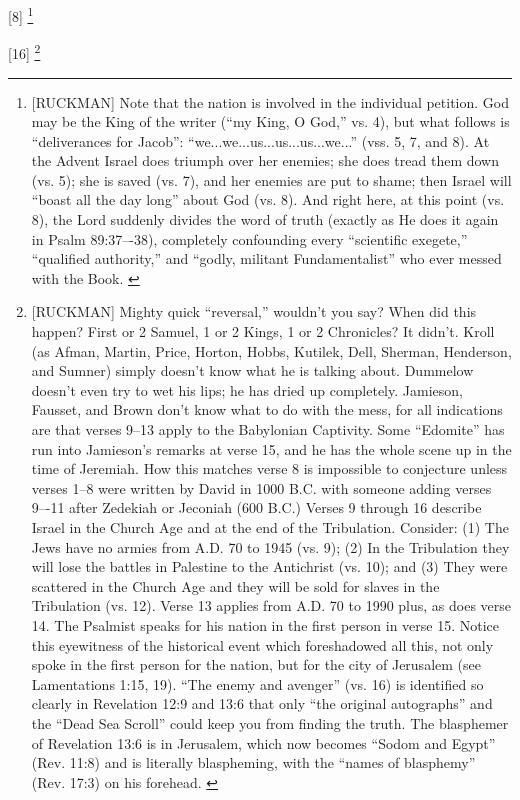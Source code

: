 [8] \footnote{[RUCKMAN] Note that the nation is involved in the individual petition. God may be the King of the writer (“my King, O God,” vs. 4), but what follows is ``deliverances for Jacob'': ``we...we...us...us...us...we...'' (vss. 5, 7, and 8). At the Advent Israel does triumph over her enemies; she does tread them down (vs. 5); she is saved (vs. 7), and her enemies are put to shame; then Israel will ``boast all the day long'' about God (vs. 8). And right here, at this point (vs. 8), the Lord suddenly divides the word of truth (exactly as He does it again in Psalm 89:37–-38), completely confounding every “scientific exegete,” “qualified authority,” and “godly, militant Fundamentalist” who ever messed with the Book. \cite{Ruckman1992Psalms}  }

[16] \footnote{[RUCKMAN] Mighty quick “reversal,” wouldn’t you say? When did this happen? First or 2 Samuel, 1 or 2 Kings, 1 or 2 Chronicles? It didn’t. Kroll (as Afman, Martin, Price, Horton, Hobbs, Kutilek, Dell, Sherman, Henderson, and Sumner) simply doesn’t know what he is talking about. Dummelow doesn’t even try to wet his lips; he has dried up completely. Jamieson, Fausset, and Brown don’t know what to do with the mess, for all indications are that verses 9–13 apply to the Babylonian Captivity. Some “Edomite” has run into Jamieson’s remarks at verse 15, and he has the whole scene up in the time of Jeremiah. How this matches verse 8 is impossible to conjecture unless verses 1–8 were written by David in 1000 B.C. with someone adding verses 9–-11 after Zedekiah or Jeconiah (600 B.C.) Verses 9 through 16 describe Israel in the Church Age and at the end of the Tribulation. Consider: (1) The Jews have no armies from A.D. 70 to 1945 (vs. 9); (2) In the Tribulation they will lose the battles in Palestine to the Antichrist (vs. 10); and (3) They were scattered in the Church Age and they will be sold for slaves in the Tribulation (vs. 12). Verse 13 applies from A.D. 70 to 1990 plus, as does verse 14. The Psalmist speaks for his nation in the first person in verse 15. Notice this eyewitness of the historical event which foreshadowed all this, not only spoke in the first person for the nation, but for the city of Jerusalem (see Lamentations 1:15, 19). ``The enemy and avenger'' (vs. 16) is identified so clearly in Revelation 12:9 and 13:6 that only ``the original autographs'' and the ``Dead Sea Scroll'' could keep you from finding the truth. The blasphemer of Revelation 13:6 is in Jerusalem, which now becomes ``Sodom and Egypt'' (Rev. 11:8) and is literally blaspheming, with the ``names of blasphemy'' (Rev. 17:3) on his forehead. \cite{Ruckman1992Psalms} }

